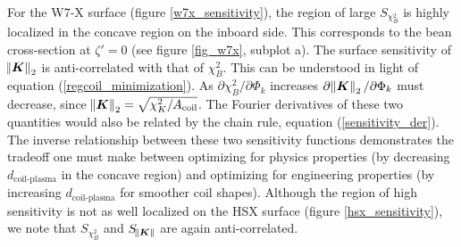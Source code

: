 \documentclass[aps,unsortedaddress]{revtex4-1}
\begin{document}
For the W7-X surface (figure \ref{w7x_sensitivity}), the region of large $S_{\chi^2_B}$ is highly localized in the concave region on the inboard side. This corresponds to the bean cross-section at $\zeta' = 0$ (see figure \ref{fig_w7x}, subplot a). The surface sensitivity of $\norm{\bm{K}}_2$ is anti-correlated with that of $\chi^2_B$. This can be understood in light of equation (\ref{regcoil_minimization}). As $\partial \chi^2_B/\partial \Phi_k$ increases $\partial \norm{\bm{K}}_2/\partial \Phi_k$ must decrease, since $\norm{\bm{K}}_2 = \sqrt{ \chi^2_K/A_{\text{coil}}}$. The Fourier  derivatives of these two quantities would also be related by the chain rule, equation (\ref{sensitivity_der}). The inverse relationship between these two sensitivity functions demonstrates the tradeoff one must make between optimizing for physics properties (by decreasing $d_{\text{coil-plasma}}$ in the concave region) and optimizing for engineering properties (by increasing $d_{\text{coil-plasma}}$ for smoother coil shapes). Although the region of high sensitivity is not as well localized on the HSX surface (figure \ref{hsx_sensitivity}), we note that $S_{\chi^2_B}$ and $S_{\norm{\bm{K}}}$ are again anti-correlated. 
\end{document}
